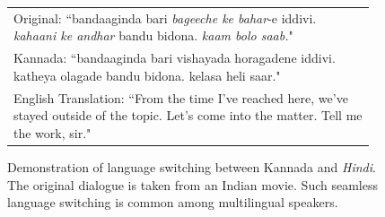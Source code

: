 


\begin{figure}[ht]
    \centering
    \renewcommand{\arraystretch}{1.4}
    \begin{tabular}{ p{0.95\linewidth}}
    \hline
    Original: {``\textsf{bandaaginda bari} \textit{bageeche ke bahar}\textsf{-e iddivi.} \textit{kahaani ke andhar} \textsf{ bandu bidona.} \textit{kaam bolo saab.}"} \\ 
    \hdashline
    \textsf{Kannada: ``bandaaginda bari vishayada horagadene iddivi. katheya olagade bandu bidona. kelasa heli saar."}\\
    English Translation:  ``From the time I've reached here, we've stayed outside of the topic. Let's come into the matter. Tell me the work, sir."\\
    \hline
    \end{tabular}
    \caption{Demonstration of language switching between \textsf{Kannada} and \textit{Hindi}.
    The original dialogue is taken from an Indian movie. Such seamless language switching is common among multilingual speakers.}
    \label{fig:example-langswitch-hinkan}
    
    

\end{figure}



